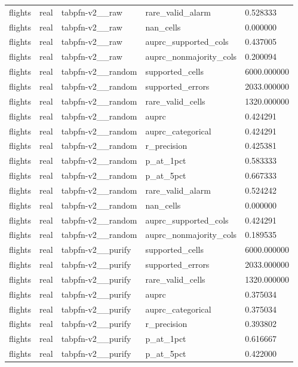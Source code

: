 \begin{tabular}{lllll}
flights & real & tabpfn-v2\_\_raw & rare\_valid\_alarm & 0.528333 \\
flights & real & tabpfn-v2\_\_raw & nan\_cells & 0.000000 \\
flights & real & tabpfn-v2\_\_raw & auprc\_supported\_cols & 0.437005 \\
flights & real & tabpfn-v2\_\_raw & auprc\_nonmajority\_cols & 0.200094 \\
flights & real & tabpfn-v2\_\_random & supported\_cells & 6000.000000 \\
flights & real & tabpfn-v2\_\_random & supported\_errors & 2033.000000 \\
flights & real & tabpfn-v2\_\_random & rare\_valid\_cells & 1320.000000 \\
flights & real & tabpfn-v2\_\_random & auprc & 0.424291 \\
flights & real & tabpfn-v2\_\_random & auprc\_categorical & 0.424291 \\
flights & real & tabpfn-v2\_\_random & r\_precision & 0.425381 \\
flights & real & tabpfn-v2\_\_random & p\_at\_1pct & 0.583333 \\
flights & real & tabpfn-v2\_\_random & p\_at\_5pct & 0.667333 \\
flights & real & tabpfn-v2\_\_random & rare\_valid\_alarm & 0.524242 \\
flights & real & tabpfn-v2\_\_random & nan\_cells & 0.000000 \\
flights & real & tabpfn-v2\_\_random & auprc\_supported\_cols & 0.424291 \\
flights & real & tabpfn-v2\_\_random & auprc\_nonmajority\_cols & 0.189535 \\
flights & real & tabpfn-v2\_\_purify & supported\_cells & 6000.000000 \\
flights & real & tabpfn-v2\_\_purify & supported\_errors & 2033.000000 \\
flights & real & tabpfn-v2\_\_purify & rare\_valid\_cells & 1320.000000 \\
flights & real & tabpfn-v2\_\_purify & auprc & 0.375034 \\
flights & real & tabpfn-v2\_\_purify & auprc\_categorical & 0.375034 \\
flights & real & tabpfn-v2\_\_purify & r\_precision & 0.393802 \\
flights & real & tabpfn-v2\_\_purify & p\_at\_1pct & 0.616667 \\
flights & real & tabpfn-v2\_\_purify & p\_at\_5pct & 0.422000 \\

\end{tabular}
